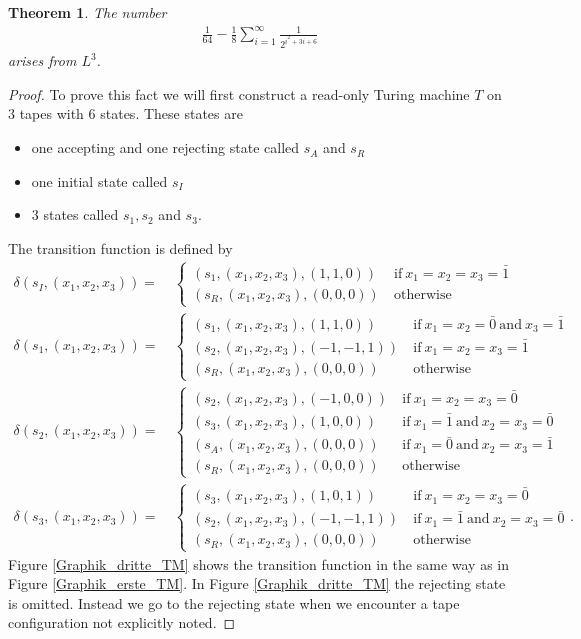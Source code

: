 \documentclass[12pt,a4paper]{scrartcl}
\theoremstyle{plain}
\newtheorem{Theorem}{Theorem}[subsection]
\theoremstyle{definition}
\newcommand{\2}{\mathbb{Z} / 2 \mathbb{Z}}
\newcommand{\1}{\bar{1}}
\newcommand{\0}{\bar{0}}
\begin{document}
\begin{Theorem}
	The number
	\begin{align*}
		\frac{1}{64} - \frac{1}{8} \sum_{i = 1}^{\infty} \frac{1}{2^{i^2 + 3i + 6}}
	\end{align*}
	arises from $L^3$.
\end{Theorem}
\begin{proof}
	To prove this fact we will first construct a read-only Turing machine $T$ on $3$ tapes with $6$ states. These states are
	\begin{itemize}
		\item one accepting and one rejecting state called $s_A$ and $s_R$
		\item one initial state called $s_I$
		\item $3$ states called $s_1, s_2$ and $s_3$.
	\end{itemize}
	The transition function is defined by
	\begin{align*}
		\delta(s_I, (x_1, x_2, x_3)) =&~ \begin{cases}
			(s_1, (x_1, x_2, x_3), (1, 1, 0)) &~ \text{if} \ x_1 = x_2 = x_3 = \1 \\
			(s_R, (x_1, x_2, x_3), (0, 0, 0)) &~ \text{otherwise}
		\end{cases} \\
		\delta(s_1, (x_1, x_2, x_3)) =&~ \begin{cases}
			(s_1, (x_1, x_2, x_3), (1, 1, 0)) &~ \text{if} \ x_1 = x_2 = \0 ~ \text{and} \ x_3 = \1 \\
			(s_2, (x_1, x_2, x_3), (-1, -1, 1)) &~ \text{if} \ x_1 = x_2 = x_3 = \1 \\
			(s_R, (x_1, x_2, x_3), (0, 0, 0)) &~ \text{otherwise}
		\end{cases} \\
		\delta(s_2, (x_1, x_2, x_3)) =&~ \begin{cases}
			(s_2, (x_1, x_2, x_3), (-1, 0, 0)) &~ \text{if} \ x_1 = x_2 = x_3 = \0  \\
			(s_3, (x_1, x_2, x_3), (1, 0, 0)) &~ \text{if} \ x_1 = \1 ~ \text{and} \ x_2 = x_3 = \0 \\
			(s_A, (x_1, x_2, x_3), (0, 0, 0)) &~ \text{if} \ x_1 = \0 ~ \text{and} \ x_2 = x_3 = \1  \\ 
			(s_R, (x_1, x_2, x_3), (0, 0, 0)) &~ \text{otherwise}
		\end{cases} \\
		\delta(s_3, (x_1, x_2, x_3)) =&~ \begin{cases}
			(s_3, (x_1, x_2, x_3), (1, 0, 1)) &~ \text{if} \ x_1 = x_2 = x_3 = \0 \\
			(s_2, (x_1, x_2, x_3), (-1, -1, 1)) &~ \text{if} \ x_1 = \1 ~ \text{and} \ x_2 = x_3 = \0 \\
			(s_R, (x_1, x_2, x_3), (0, 0, 0)) &~ \text{otherwise}
		\end{cases}.
	\end{align*}
	Figure \ref{Graphik_dritte_TM} shows the transition function in the same way as in Figure \ref{Graphik_erste_TM}. In Figure \ref{Graphik_dritte_TM} the rejecting state is omitted. Instead we go to the rejecting state when we encounter a tape configuration not explicitly noted.
	

\end{proof}
\end{document}
